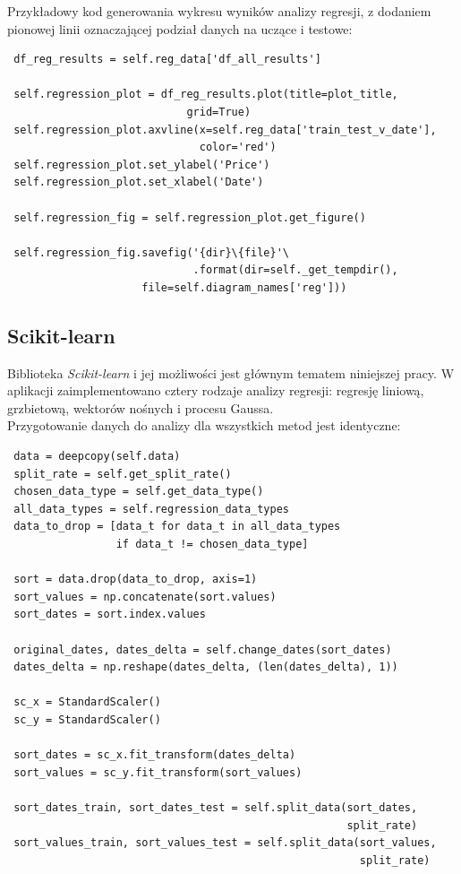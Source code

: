 Przykładowy kod generowania wykresu wyników analizy regresji, z dodaniem pionowej linii oznaczającej podział danych na uczące i testowe:
\begin{lstlisting}
 df_reg_results = self.reg_data['df_all_results']
 
 self.regression_plot = df_reg_results.plot(title=plot_title,
				            grid=True)
 self.regression_plot.axvline(x=self.reg_data['train_test_v_date'],
                              color='red')
 self.regression_plot.set_ylabel('Price')
 self.regression_plot.set_xlabel('Date')
 
 self.regression_fig = self.regression_plot.get_figure()
 
 self.regression_fig.savefig('{dir}\{file}'\
                             .format(dir=self._get_tempdir(),
				     file=self.diagram_names['reg']))
\end{lstlisting}

\subsection{Scikit-learn}
Biblioteka \textit{Scikit-learn} i jej możliwości jest głównym tematem niniejszej pracy. W aplikacji zaimplementowano cztery rodzaje analizy regresji: regresję liniową, grzbietową, wektorów nośnych i procesu Gaussa.\\

Przygotowanie danych do analizy dla wszystkich metod jest identyczne:
\begin{lstlisting}
 data = deepcopy(self.data)
 split_rate = self.get_split_rate()
 chosen_data_type = self.get_data_type()
 all_data_types = self.regression_data_types
 data_to_drop = [data_t for data_t in all_data_types
                 if data_t != chosen_data_type]

 sort = data.drop(data_to_drop, axis=1)
 sort_values = np.concatenate(sort.values)
 sort_dates = sort.index.values

 original_dates, dates_delta = self.change_dates(sort_dates)
 dates_delta = np.reshape(dates_delta, (len(dates_delta), 1))

 sc_x = StandardScaler()
 sc_y = StandardScaler()

 sort_dates = sc_x.fit_transform(dates_delta)
 sort_values = sc_y.fit_transform(sort_values)

 sort_dates_train, sort_dates_test = self.split_data(sort_dates,
                                                     split_rate)
 sort_values_train, sort_values_test = self.split_data(sort_values,
                                                       split_rate)
\end{lstlisting}

